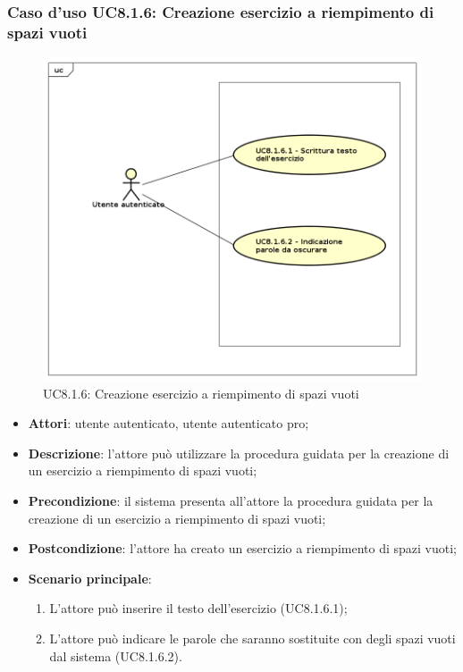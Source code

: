 \subsubsection{Caso d'uso UC8.1.6: Creazione esercizio a riempimento di spazi vuoti}
	\label{UC8.1.6}
	\begin{figure}[h]
		\centering
			\includegraphics[scale=0.45,keepaspectratio]{UML/UC8_1_6.png}
		\caption{UC8.1.6: Creazione esercizio a riempimento di spazi vuoti}
	\end{figure}
	\FloatBarrier
	\begin{itemize}
		\item
			\textbf{Attori}: utente autenticato, utente autenticato pro;
		\item		
			\textbf{Descrizione}: l'attore può utilizzare la procedura guidata per la creazione di un esercizio a riempimento di spazi vuoti;
		\item
			\textbf{Precondizione}: il sistema presenta all'attore la procedura guidata per la creazione di un esercizio a riempimento di spazi vuoti;
		\item
			\textbf{Postcondizione}: l'attore ha creato un esercizio a riempimento di spazi vuoti;
		\item
			\textbf{Scenario principale}:
	       		\begin{enumerate}
	       			\item
	       			L'attore può inserire il testo dell'esercizio (UC8.1.6.1);
	       			\item
	       			L'attore può indicare le parole che saranno sostituite con degli spazi vuoti dal sistema (UC8.1.6.2).
	 			\end{enumerate}
	\end{itemize}
	
